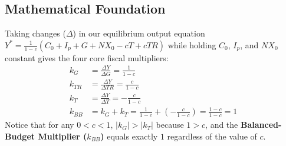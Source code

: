 \documentclass[11pt,letterpaper]{article}
\begin{document}
\subsection*{Mathematical Foundation}
Taking changes ($\Delta$) in our equilibrium output equation $Y^* = \frac{1}{1-c}(C_0 + I_p + G + NX_0 - cT + cTR)$ while holding $C_0$, $I_p$, and $NX_0$ constant gives the four core fiscal multipliers:
\begin{align}
k_G &= \frac{\Delta Y}{\Delta G} = \frac{1}{1 - c} \label{eq:kg} \\[4pt]
k_{TR} &= \frac{\Delta Y}{\Delta TR} = \frac{c}{1 - c} \label{eq:ktr} \\[4pt]
k_T &= \frac{\Delta Y}{\Delta T} = -\frac{c}{1 - c} \label{eq:kt} \\[4pt]
k_{BB} &= k_G + k_T = \frac{1}{1 - c} + \left(-\frac{c}{1 - c}\right) = \frac{1 - c}{1 - c} = 1 \label{eq:kbb}
\end{align}
Notice that for any $0 < c < 1$, $|k_G| > |k_T|$ because $1 > c$, and the \textbf{Balanced-Budget Multiplier ($k_{BB}$)} equals exactly $1$ regardless of the value of $c$.
\end{document}
